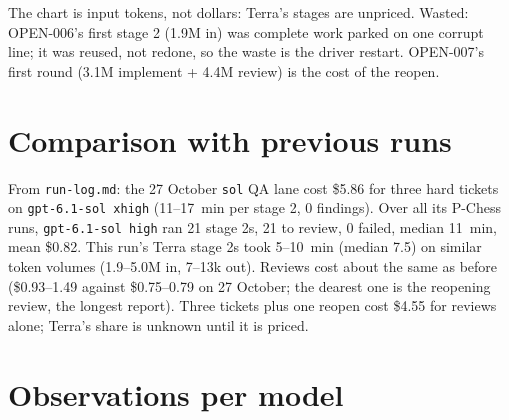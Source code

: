 \documentclass[11pt,a4paper]{article}
\begin{document}
\begin{center}
\end{center}

The chart is input tokens, not dollars: Terra's stages are unpriced. Wasted: OPEN-006's first
stage 2 (1.9M in) was complete work parked on one corrupt line; it was reused, not redone, so
the waste is the driver restart. OPEN-007's first round (3.1M implement + 4.4M review) is the
cost of the reopen.

\section*{Comparison with previous runs}

From \texttt{run-log.md}: the 27 October \texttt{sol} QA lane cost \$5.86 for three hard tickets
on \texttt{gpt-6.1-sol xhigh} (11--17~min per stage 2, 0 findings). Over all its P-Chess runs,
\texttt{gpt-6.1-sol high} ran 21 stage 2s, 21 to review, 0 failed, median 11~min, mean \$0.82.
This run's Terra stage 2s took 5--10~min (median 7.5) on similar token volumes (1.9--5.0M in,
7--13k out). Reviews cost about the same as before (\$0.93--1.49 against \$0.75--0.79 on 27
October; the dearest one is the reopening review, the longest report). Three tickets plus one
reopen cost \$4.55 for reviews alone; Terra's share is unknown until it is priced.

\section*{Observations per model}
\end{document}
